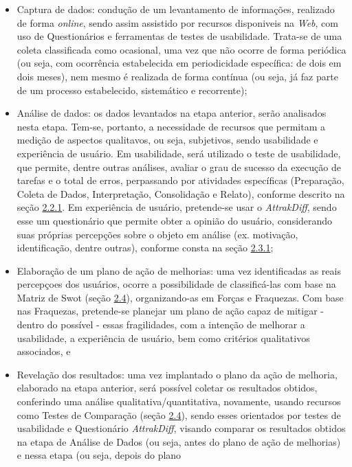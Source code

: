 \begin{itemize}
	\item Captura de dados: condução de um levantamento de informações, realizado de forma \textit{online}, sendo assim assistido por recursos disponiveis na \textit{Web}, com uso de Questionários e ferramentas de testes de usabilidade. Trata-se de uma coleta classificada como ocasional, uma vez que não ocorre de forma periódica (ou seja, com ocorrência estabelecida em periodicidade específica: de dois em dois meses), nem mesmo é realizada de forma contínua (ou seja, já faz parte de um processo estabelecido, sistemático e recorrente);
	\item Análise de dados: os dados levantados na etapa anterior, serão analisados nesta etapa. Tem-se, portanto, a necessidade de recursos que permitam a medição de aspectos qualitavos, ou seja, subjetivos, sendo usabilidade e experiência de usuário. Em usabilidade, será utilizado o teste de usabilidade, que permite, dentre outras análises, avaliar o grau de sucesso da execução de tarefas e o total de erros, perpassando por atividades específicas (Preparação, Coleta de Dados, Interpretação, Consolidação e Relato), conforme 
	descrito na seção \hyperref[sec:Medição1]{2.2.1}. Em experiência de usuário, pretende-se usar o \textit{AttrakDiff}, sendo esse um questionário que permite obter a opinião do usuário, considerando suas próprias percepções sobre o objeto em análise (ex. motivação, identificação, dentre outras), conforme consta na seção \hyperref[sec:Experiencia de Usuario]{2.3.1};
	\item Elaboração de um plano de ação de melhorias: uma vez identificadas as reais percepçoes dos usuários, ocorre a possibilidade de classificá-las com base na Matriz de Swot (seção \hyperref[sec:Teste de Comparação]{2.4}), organizando-as em Forças e Fraquezas. Com base nas Fraquezas, pretende-se planejar um plano de ação capaz de mitigar - dentro do possível - essas fragilidades, com a intenção de melhorar a usabilidade, a experiência de usuário, bem como critérios qualitativos associados, e
	\item Revelação dos resultados: uma vez implantado o plano da ação de melhoria, elaborado na etapa anterior, será possível coletar os resultados obtidos, conferindo uma análise qualitativa/quantitativa, novamente, usando recursos como Testes de Comparação (seção \hyperref[sec:Teste de Comparação]{2.4}), sendo esses orientados por testes de usabilidade e Questionário \textit{AttrakDiff}, visando comparar os resultados obtidos na etapa de Análise de Dados (ou seja, antes do plano de ação de melhorias) e nessa etapa (ou seja, depois do plano 

\end{itemize}
